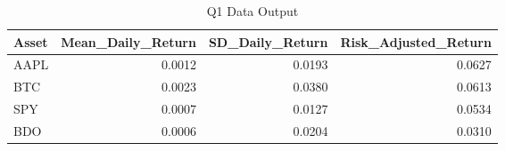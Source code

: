 \begin{table}[H]
\centering
\caption{Q1 Data Output}
\label{tab:q1}
\begin{tabular}{lrrr}
\toprule
Asset & Mean\_Daily\_Return & SD\_Daily\_Return & Risk\_Adjusted\_Return \\
\midrule
AAPL & 0.0012 & 0.0193 & 0.0627 \\
BTC & 0.0023 & 0.0380 & 0.0613 \\
SPY & 0.0007 & 0.0127 & 0.0534 \\
BDO & 0.0006 & 0.0204 & 0.0310 \\
\bottomrule
\end{tabular}
\end{table}
